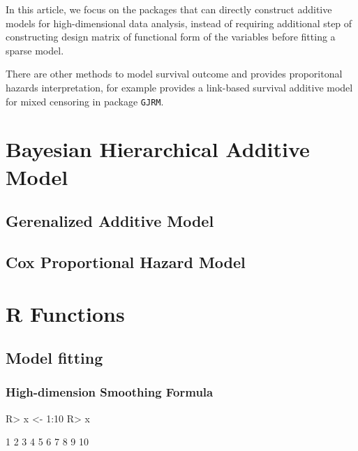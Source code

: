 \documentclass[
]{jss}
\begin{document}
In this article, we focus on the packages that can directly construct
additive models for high-dimensional data analysis, instead of requiring
additional step of constructing design matrix of functional form of the
variables before fitting a sparse model.

There are other methods to model survival outcome and provides
proporitonal hazards interpretation, for example \cite{Marra2021}
provides a link-based survival additive model for mixed censoring in
package \texttt{GJRM}.

\hypertarget{bayesian-hierarchical-additive-model}{%
\section{Bayesian Hierarchical Additive
Model}\label{bayesian-hierarchical-additive-model}}

\hypertarget{gerenalized-additive-model}{%
\subsection{Gerenalized Additive
Model}\label{gerenalized-additive-model}}

\hypertarget{cox-proportional-hazard-model}{%
\subsection{Cox Proportional Hazard
Model}\label{cox-proportional-hazard-model}}

\hypertarget{r-functions}{%
\section{R Functions}\label{r-functions}}

\hypertarget{model-fitting}{%
\subsection{Model fitting}\label{model-fitting}}

\hypertarget{high-dimension-smoothing-formula}{%
\subsubsection{High-dimension Smoothing
Formula}\label{high-dimension-smoothing-formula}}

\begin{CodeChunk}
\begin{CodeInput}
R> x <- 1:10
R> x
\end{CodeInput}
\begin{CodeOutput}
 [1]  1  2  3  4  5  6  7  8  9 10
\end{CodeOutput}
\end{CodeChunk}
\end{document}
